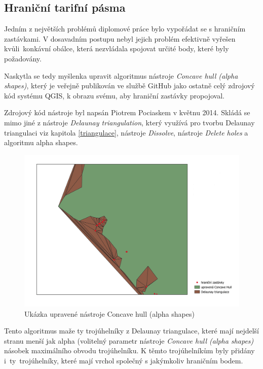 \subsection{Hraniční tarifní pásma}
\label{hranice}

Jedním z největších problémů diplomové práce bylo vypořádat se s hraničním zastávkami.
V dosavadním postupu nebyl jejich problém efektivně vyřešen kvůli~kon\-kávní obálce,
která nezvládala spojovat určité body, které byly požadovány.

Naskytla se tedy myšlenka upravit algoritmus nástroje \textit{Concave hull (alpha sha\-pes)},
který je veřejně publikován ve službě GitHub jako ostatně celý zdrojový kód systému QGIS, k obrazu
svému, aby hraniční zastávky propojoval. 

Zdrojový kód nástroje byl napsán Piotrem Pociaskem v květnu 2014. Skládá se mimo jiné z nástroje
\textit{Delaunay triangulation}, který využívá pro tvorbu Delaunay triangulaci viz kapitola \ref{triangulace},
nástroje \textit{Dissolve}, nástroje \textit{Delete holes} a algoritmu alpha shapes.

\begin{figure}[H] \centering
    \includegraphics[width=400pt]{./pictures/concave_hull_upravena.png}
    \caption[Ukázka upravené nástroje Concave hull (alpha shapes)]{Ukázka upravené nástroje Concave hull (alpha shapes)}
	\label{fig:concave_hull_upravena}              
\end{figure}

Tento algoritmus maže ty trojúhelníky z Delaunay triangulace, které mají nej\-delší stranu menší jak alpha (volitelný
parametr nástroje \textit{Concave hull (alpha sha\-pes)} násobek maximálního obvodu trojúhelníku.
K těmto trojúhelníkům byly přidá\-ny i~ty~trojúhelníky, které mají vrchol společný s jakýmkoliv hraničním bodem.

